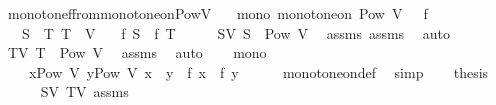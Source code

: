 \begin{isabellebody}
\endisatagproof
{\isafoldproof}%
%
\isadelimproof
\isanewline
%
\endisadelimproof
\isanewline
{}\isamarkupfalse%
\ monotone{\isacharunderscore}{\kern0pt}f{\isacharunderscore}{\kern0pt}from{\isacharunderscore}{\kern0pt}monotone{\isacharunderscore}{\kern0pt}on{\isacharunderscore}{\kern0pt}PowV{\isacharcolon}{\kern0pt}\isanewline
\ \ \ mono{\isacharcolon}{\kern0pt}\ {\isachardoublequoteopen}monotone{\isacharunderscore}{\kern0pt}on\ {\isacharparenleft}{\kern0pt}Pow\ V{\isacharparenright}{\kern0pt}\ {\isacharparenleft}{\kern0pt}{\isasymsubseteq}{\isacharparenright}{\kern0pt}\ {\isacharparenleft}{\kern0pt}{\isasymle}{\isacharparenright}{\kern0pt}\ f{\isachardoublequoteclose}\isanewline
\ \ \ {\isachardoublequoteopen}S\ {\isasymsubseteq}\ T{\isachardoublequoteclose}\ {\isachardoublequoteopen}T\ {\isasymsubseteq}\ V{\isachardoublequoteclose}\isanewline
\ \ \ {\isachardoublequoteopen}f\ S\ {\isasymle}\ f\ T{\isachardoublequoteclose}\isanewline
%
\isadelimproof
%
\endisadelimproof
%
\isatagproof
{}\isamarkupfalse%
\ {\isacharminus}{\kern0pt}\isanewline
\ \ \isamarkupfalse%
\ SV{\isacharcolon}{\kern0pt}\ {\isachardoublequoteopen}S\ {\isasymin}\ Pow\ V{\isachardoublequoteclose}\ \isamarkupfalse%
\ assms{\isacharparenleft}{\kern0pt}{}{\isacharparenright}{\kern0pt}\ assms{\isacharparenleft}{\kern0pt}{}{\isacharparenright}{\kern0pt}\ \isamarkupfalse%
\ auto\isanewline
\ \ \isamarkupfalse%
\ TV{\isacharcolon}{\kern0pt}\ {\isachardoublequoteopen}T\ {\isasymin}\ Pow\ V{\isachardoublequoteclose}\ \isamarkupfalse%
\ assms{\isacharparenleft}{\kern0pt}{}{\isacharparenright}{\kern0pt}\ \isamarkupfalse%
\ auto\isanewline
\ \ \isamarkupfalse%
\ mono\ \isamarkupfalse%
\isanewline
\ \ \ \ {\isachardoublequoteopen}{\isasymforall}x{\isasymin}Pow\ V{\isachardot}{\kern0pt}\ {\isasymforall}y{\isasymin}Pow\ V{\isachardot}{\kern0pt}\ x\ {\isasymsubseteq}\ y\ {\isasymlongrightarrow}\ f\ x\ {\isasymle}\ f\ y{\isachardoublequoteclose}\isanewline
\ \ \ \ \isamarkupfalse%
\ monotone{\isacharunderscore}{\kern0pt}on{\isacharunderscore}{\kern0pt}def\ \isamarkupfalse%
\ simp\isanewline
\ \ \isamarkupfalse%
\ {\isacharquery}{\kern0pt}thesis\isanewline
\ \ \ \ \isamarkupfalse%
\ SV\ TV\ assms{\isacharparenleft}{\kern0pt}{}{\isacharparenright}{\kern0pt}\ \isamarkupfalse%

\end{isabellebody}
